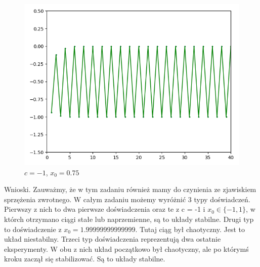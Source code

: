 \documentclass[]{article}
\begin{document}
\begin{figure}[!htbp]
	\includegraphics[scale=1]{task6-10,75}
	\centering
	\caption{$c = -1$, $x_0 = 0.75$}
\end{figure}


Wnioski. Zauważmy, że w tym zadaniu również mamy do czynienia ze zjawiskiem sprzężenia zwrotnego. W całym zadaniu możemy wyróżnić 3 typy doświadczeń. Pierwszy z nich to dwa pierwsze doświadczenia oraz te z c = -1 i $x_0 \in \{-1,1\}$, w którch otrzymano ciągi stałe lub naprzemienne, są to układy stabilne. Drugi typ to doświadczenie z $x_0 = 1.99999999999999$. Tutaj ciąg był chaotyczny. Jest to układ niestabilny. Trzeci typ doświadczenia reprezentują dwa ostatnie eksperymenty. W obu z nich układ początkowo był chaotyczny, ale po którymś kroku zaczął się stabilizować. Są to układy stabilne.
\end{document}
